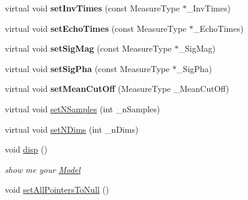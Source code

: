 \begin{DoxyCompactItemize}
\item 
\hypertarget{class_ox_1_1_calculator_a1dcb241d551a06436108a9f4bf916ece}{virtual void {\bfseries set\-Inv\-Times} (const Measure\-Type $\ast$\-\_\-\-Inv\-Times)}\label{class_ox_1_1_calculator_a1dcb241d551a06436108a9f4bf916ece}

\item 
\hypertarget{class_ox_1_1_calculator_aaf50e9d3fae8e95ff981bf15e17bba28}{virtual void {\bfseries set\-Echo\-Times} (const Measure\-Type $\ast$\-\_\-\-Echo\-Times)}\label{class_ox_1_1_calculator_aaf50e9d3fae8e95ff981bf15e17bba28}

\item 
\hypertarget{class_ox_1_1_calculator_a51fb95a1a68b1e14b659761c1f64aaab}{virtual void {\bfseries set\-Sig\-Mag} (const Measure\-Type $\ast$\-\_\-\-Sig\-Mag)}\label{class_ox_1_1_calculator_a51fb95a1a68b1e14b659761c1f64aaab}

\item 
\hypertarget{class_ox_1_1_calculator_a7b753dac0897ee4a5cb9c4d7a21d0926}{virtual void {\bfseries set\-Sig\-Pha} (const Measure\-Type $\ast$\-\_\-\-Sig\-Pha)}\label{class_ox_1_1_calculator_a7b753dac0897ee4a5cb9c4d7a21d0926}

\item 
\hypertarget{class_ox_1_1_calculator_ad945e3f4dd3405c940bc8a22ea3f3ee9}{virtual void {\bfseries set\-Mean\-Cut\-Off} (Measure\-Type \-\_\-\-Mean\-Cut\-Off)}\label{class_ox_1_1_calculator_ad945e3f4dd3405c940bc8a22ea3f3ee9}

\item 
virtual void \hyperlink{class_ox_1_1_calculator_a1d0d07b7840883449168448983d43289}{set\-N\-Samples} (int \-\_\-n\-Samples)
\item 
virtual void \hyperlink{class_ox_1_1_calculator_a40c854c0d75685ecc1da531f7400e3b1}{set\-N\-Dims} (int \-\_\-n\-Dims)
\item 
\hypertarget{class_ox_1_1_calculator_a938a4bb0d2bc586bfb6982df28befbbf}{void \hyperlink{class_ox_1_1_calculator_a938a4bb0d2bc586bfb6982df28befbbf}{disp} ()}\label{class_ox_1_1_calculator_a938a4bb0d2bc586bfb6982df28befbbf}

\begin{DoxyCompactList}\small\item\em show me your \hyperlink{class_ox_1_1_model}{Model} \end{DoxyCompactList}\item 
\hypertarget{class_ox_1_1_calculator_acaaddad6379df03cccd825d565c9dd0e}{void \hyperlink{class_ox_1_1_calculator_acaaddad6379df03cccd825d565c9dd0e}{set\-All\-Pointers\-To\-Null} ()}\label{class_ox_1_1_calculator_acaaddad6379df03cccd825d565c9dd0e}


\end{DoxyCompactItemize}
